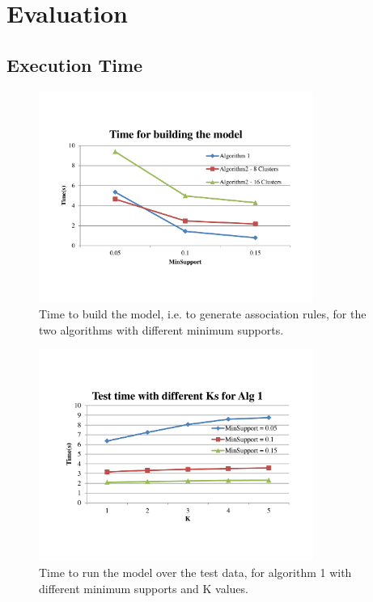 \section{Evaluation}

\subsection{Execution Time}

\begin{figure}
\centering
\includegraphics[width=0.8\textwidth]{buildmodel}
\caption{\footnotesize Time to build the model, i.e. to generate association
rules, for the two algorithms with different minimum supports. }
\label{Fig:buildmodel}
\end{figure}

\begin{figure}
\centering
\includegraphics[width=0.8\textwidth]{TestingTime1}
\caption{\footnotesize Time to run the model over the test data, for algorithm
1 with different minimum supports and K values. }
\label{Fig:TestTime1}
\end{figure}

